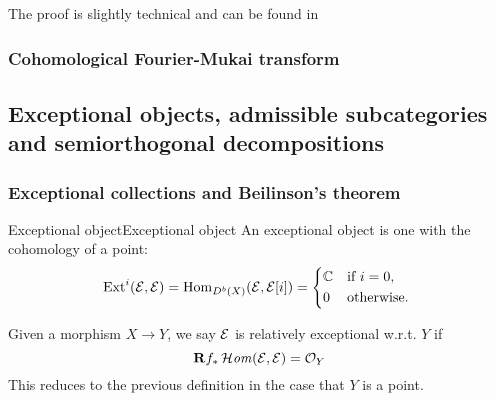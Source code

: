 The proof is slightly technical and can be found in \cite[\S7][Proposition~7.1]{Huybrechts}



\subsubsection{Cohomological Fourier-Mukai transform}





\subsection{Exceptional objects, admissible subcategories and semiorthogonal decompositions}

\subsubsection{Exceptional collections and Beilinson's theorem}

\begin{definition}{Exceptional object}{Exceptional object}
    An exceptional object is one with the cohomology of a point:
    \begin{equation*}
        \Ext^i(\calE,\calE) = \Hom_{D^b(X)}(\calE,\calE[i]) = \begin{cases*}
            \C & if $i=0$, \\
            0 & otherwise.
        \end{cases*}
    \end{equation*}

    Given a morphism $X\rightarrow Y$, we say $\mathcal{E}$ is relatively exceptional w.r.t. $Y$ if $$\mathbf{R} f_* \operatorname{\mathcal{H}\mathit{om}}(\mathcal{E}, \mathcal{E})=\mathcal{O}_Y$$
    This reduces to the previous definition in the case that $Y$ is a point.
\end{definition}

